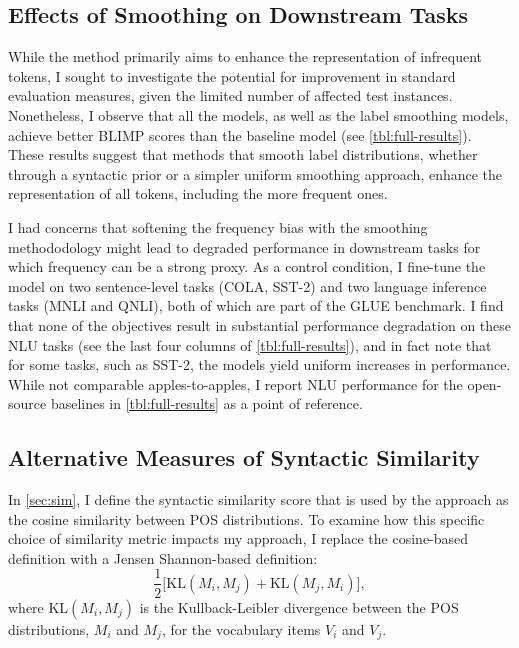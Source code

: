 \subsection{Effects of Smoothing on Downstream Tasks}
While the method primarily aims to enhance the representation of infrequent tokens, I sought to investigate the potential for improvement in standard evaluation measures, given the limited number of affected test instances. Nonetheless, I observe that all the \smoothing models, as well as the label smoothing models, achieve better BLIMP scores than the baseline model (see \cref{tbl:full-results}). These results suggest that methods that smooth label distributions, whether through a syntactic prior or a simpler uniform smoothing approach, enhance the representation of all tokens, including the more frequent ones.

I had concerns that softening the frequency bias with the smoothing methododology might lead to degraded performance in downstream tasks for which frequency can be a strong proxy. As a control condition, I fine-tune the model on two sentence-level tasks (COLA, SST-2) and two language inference tasks (MNLI and QNLI), both of which are part of the GLUE \citep{wang2018glue} benchmark. I find that none of the \smoothing objectives result in substantial performance degradation on these NLU tasks (see the last four columns of \cref{tbl:full-results}), and in fact note that for some tasks, such as SST-2, the \smoothing models yield uniform increases in performance. While not comparable apples-to-apples, I report NLU performance for the open-source baselines in \cref{tbl:full-results} as a point of reference. 

\subsection{Alternative Measures of Syntactic Similarity}

In \cref{sec:sim}, I define the syntactic similarity score that is used by the \smoothing approach as the cosine similarity between POS distributions. To examine how this specific choice of similarity metric impacts my approach, I replace the cosine-based definition with a Jensen Shannon-based definition:
$$ \frac{1}{2}\big[ \text{KL}(M_i, M_j ) + \text{KL}(M_j, M_i)\big],$$
where KL$(M_i, M_j)$ is the Kullback-Leibler divergence between the POS distributions, $M_i$ and $M_j$, for the vocabulary items $V_i$ and $V_j$.

